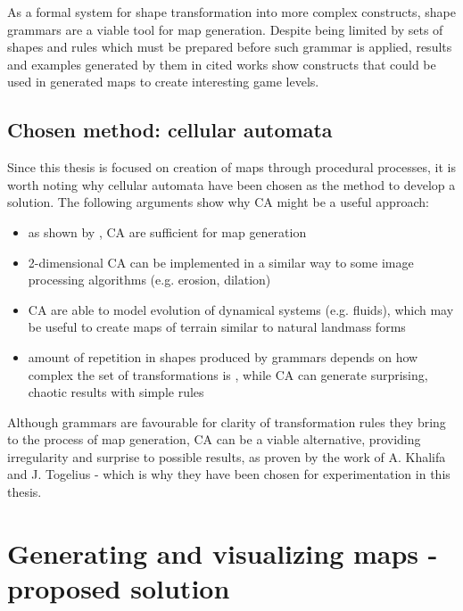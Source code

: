 \documentclass[12pt]{report}
\begin{document}
As a formal system for shape transformation into more complex constructs, shape grammars are a viable tool for map generation. Despite being limited by sets of shapes and rules which must be prepared before such grammar is applied, results and examples generated by them in cited works show constructs that could be used in generated maps to create interesting game levels.
\section{Chosen method: cellular automata}
 
Since this thesis is focused on creation of maps through procedural processes, it is worth noting why cellular automata have been chosen as the method to develop a solution. The following arguments show why CA might be a useful approach:

\begin{itemize}
	\item as shown by \autocite{johnson2010cellular}, CA are sufficient for map generation
	\item 2-dimensional CA can be implemented in a similar way to some image processing algorithms (e.g. erosion, dilation)
	\item CA are able to model evolution of dynamical systems (e.g. fluids), which may be useful to create maps of terrain similar to natural landmass forms 
	\item amount of repetition in shapes produced by grammars depends on how complex the set of transformations is \autocite{CHOMSKY1959137}, while CA can generate surprising, chaotic results with simple rules \autocite{wolfram1984cellular}
\end{itemize}

Although grammars are favourable for clarity of transformation rules they bring to the process of map generation, CA can be a viable alternative, providing irregularity and surprise to possible results, as proven by the work of A. Khalifa and J. Togelius \autocite{Khalifa2017MarahelA} - which is why they have been chosen for experimentation in this thesis.

\chapter{Generating and visualizing maps - proposed solution} \label{rozdzial.praktyka} 
\end{document}
